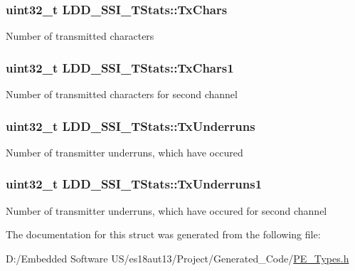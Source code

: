 \subsubsection[{Tx\+Chars}]{\setlength{\rightskip}{0pt plus 5cm}uint32\+\_\+t L\+D\+D\+\_\+\+S\+S\+I\+\_\+\+T\+Stats\+::\+Tx\+Chars}\label{struct_l_d_d___s_s_i___t_stats_abaff1182d41c2c211ce8da947df77bbd}
Number of transmitted characters \hypertarget{struct_l_d_d___s_s_i___t_stats_a0721d681a52cc566e4c89de10e962923}{}
\subsubsection[{Tx\+Chars1}]{\setlength{\rightskip}{0pt plus 5cm}uint32\+\_\+t L\+D\+D\+\_\+\+S\+S\+I\+\_\+\+T\+Stats\+::\+Tx\+Chars1}\label{struct_l_d_d___s_s_i___t_stats_a0721d681a52cc566e4c89de10e962923}
Number of transmitted characters for second channel \hypertarget{struct_l_d_d___s_s_i___t_stats_a5ac8911e76989013a9a4757a90aa5660}{}
\subsubsection[{Tx\+Underruns}]{\setlength{\rightskip}{0pt plus 5cm}uint32\+\_\+t L\+D\+D\+\_\+\+S\+S\+I\+\_\+\+T\+Stats\+::\+Tx\+Underruns}\label{struct_l_d_d___s_s_i___t_stats_a5ac8911e76989013a9a4757a90aa5660}
Number of transmitter underruns, which have occured \hypertarget{struct_l_d_d___s_s_i___t_stats_a14fb329147ead1d214cd25ffd3b39f6d}{}
\subsubsection[{Tx\+Underruns1}]{\setlength{\rightskip}{0pt plus 5cm}uint32\+\_\+t L\+D\+D\+\_\+\+S\+S\+I\+\_\+\+T\+Stats\+::\+Tx\+Underruns1}\label{struct_l_d_d___s_s_i___t_stats_a14fb329147ead1d214cd25ffd3b39f6d}
Number of transmitter underruns, which have occured for second channel 

The documentation for this struct was generated from the following file\+:\begin{DoxyCompactItemize}
\item 
D\+:/\+Embedded Software U\+S/es18aut13/\+Project/\+Generated\+\_\+\+Code/\hyperlink{_p_e___types_8h}{P\+E\+\_\+\+Types.\+h}\end{DoxyCompactItemize}

